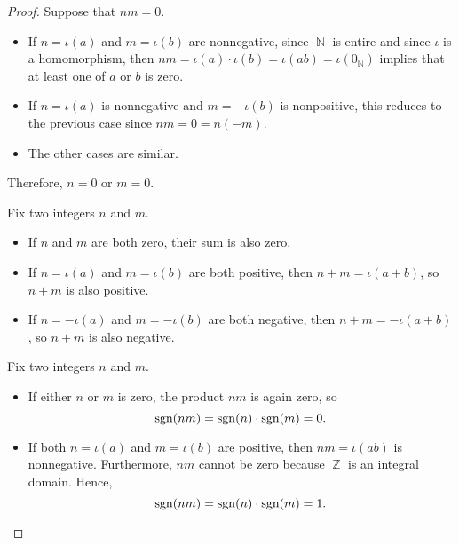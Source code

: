 \begin{proof}
   Suppose that \( nm = 0 \).

  \begin{itemize}
    \item If \( n = \iota(a) \) and \( m = \iota(b) \) are nonnegative, since \( \BbbN \) is entire and since \( \iota \) is a homomorphism, then \( nm = \iota(a) \cdot \iota(b) = \iota(ab) = \iota(0_\BbbN) \) implies that at least one of \( a \) or \( b \) is zero.
    \item If \( n = \iota(a) \) is nonnegative and \( m = -\iota(b) \) is nonpositive, this reduces to the previous case since \( nm = 0 = n(-m) \).
    \item The other cases are similar.
  \end{itemize}

  Therefore, \( n = 0 \) or \( m = 0 \).

   Fix two integers \( n \) and \( m \).

  \begin{itemize}
    \item If \( n \) and \( m \) are both zero, their sum is also zero.
    \item If \( n = \iota(a) \) and \( m = \iota(b) \) are both positive, then \( n + m = \iota(a + b) \), so \( n + m \) is also positive.
    \item If \( n = -\iota(a) \) and \( m = -\iota(b) \) are both negative, then \( n + m = -\iota(a + b) \), so \( n + m \) is also negative.
  \end{itemize}

   Fix two integers \( n \) and \( m \).

  \begin{itemize}
    \item If either \( n \) or \( m \) is zero, the product \( nm \) is again zero, so
    \begin{equation*}
      \operatorname{sgn}(nm) = \operatorname{sgn}(n) \cdot \operatorname{sgn}(m) = 0.
    \end{equation*}

    \item If both \( n = \iota(a) \) and \( m = \iota(b) \) are positive, then \( nm = \iota(ab) \) is nonnegative. Furthermore, \( nm \) cannot be zero because \( \BbbZ \) is an integral domain. Hence,
    \begin{equation*}
      \operatorname{sgn}(nm) = \operatorname{sgn}(n) \cdot \operatorname{sgn}(m) = 1.
    \end{equation*}


\end{itemize}
\end{proof}
